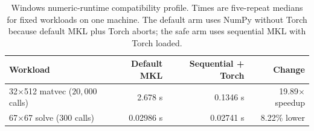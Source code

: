 \begin{table}[t]
\centering
\caption{Windows numeric-runtime compatibility profile. Times are five-repeat medians for fixed workloads on one machine. The default arm uses NumPy without Torch because default MKL plus Torch aborts; the safe arm uses sequential MKL with Torch loaded.}
\label{tab:windows-numeric-runtime}
\small
\begin{tabular}{lrrr}
\toprule
Workload & Default MKL & Sequential + Torch & Change \\
\midrule
32$\times$512 matvec ($20{,}000$ calls) & 2.678 s & 0.1346 s & 19.89$\times$ speedup \\
67$\times$67 solve ($300$ calls) & 0.02986 s & 0.02741 s & 8.22\% lower \\
\bottomrule
\end{tabular}
\end{table}
